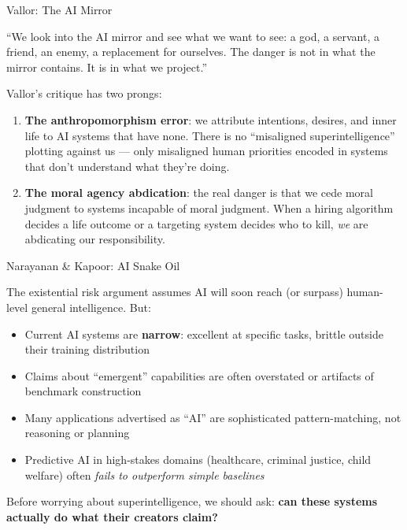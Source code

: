 \documentclass[aspectratio=169,11pt]{beamer}
\begin{document}
\begin{frame}[shrink=8]{Vallor: The AI Mirror}
\begin{quotebox}
``We look into the AI mirror and see what we want to see: a god, a servant, a friend, an enemy, a replacement for ourselves. The danger is not in what the mirror contains. It is in what we project.''
\end{quotebox}

\vspace{0.2cm}
Vallor's critique has two prongs:
\begin{enumerate}
    \item \textbf{The anthropomorphism error}: we attribute intentions, desires, and inner life to AI systems that have none. There is no ``misaligned superintelligence'' plotting against us --- only misaligned human priorities encoded in systems that don't understand what they're doing.
    \item \textbf{The moral agency abdication}: the real danger is that we cede moral judgment to systems incapable of moral judgment. When a hiring algorithm decides a life outcome or a targeting system decides who to kill, \emph{we} are abdicating our responsibility.
\end{enumerate}

\parencite{vallor_ai_mirror_2024}
\end{frame}

\begin{frame}[shrink=15]{Narayanan \& Kapoor: AI Snake Oil}
\begin{objectionbox}
The existential risk argument assumes AI will soon reach (or surpass) human-level general intelligence. But:
\begin{itemize}
    \item Current AI systems are \textbf{narrow}: excellent at specific tasks, brittle outside their training distribution
    \item Claims about ``emergent'' capabilities are often overstated or artifacts of benchmark construction
    \item Many applications advertised as ``AI'' are sophisticated pattern-matching, not reasoning or planning
    \item Predictive AI in high-stakes domains (healthcare, criminal justice, child welfare) often \emph{fails to outperform simple baselines}
\end{itemize}
\vspace{0.1cm}
\scriptsize\parencite{narayanan_snake_oil_2024}
\end{objectionbox}

\vspace{0.2cm}
Before worrying about superintelligence, we should ask: \textbf{can these systems actually do what their creators claim?}
\end{frame}
\end{document}
